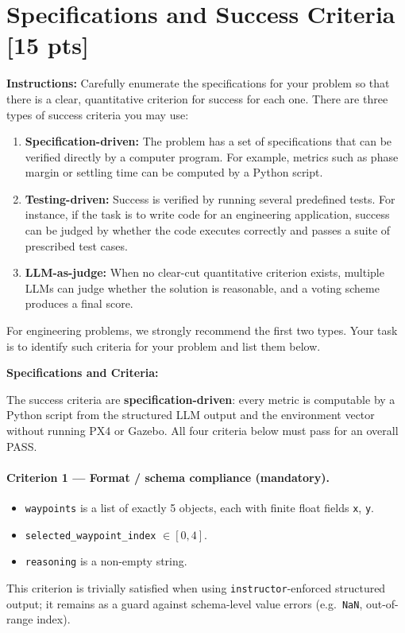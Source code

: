 \documentclass[12pt]{article}
\begin{document}
\newpage
\section{Specifications and Success Criteria [15 pts]}

\noindent\textbf{Instructions:} Carefully enumerate the specifications for your problem so that
there is a clear, quantitative criterion for success for each one. There are three types of
success criteria you may use:
\begin{enumerate}
  \item \textbf{Specification-driven:} The problem has a set of specifications that can be
    verified directly by a computer program. For example, metrics such as phase margin or
    settling time can be computed by a Python script.
  \item \textbf{Testing-driven:} Success is verified by running several predefined tests. For
    instance, if the task is to write code for an engineering application, success can be judged
    by whether the code executes correctly and passes a suite of prescribed test cases.
  \item \textbf{LLM-as-judge:} When no clear-cut quantitative criterion exists, multiple LLMs
    can judge whether the solution is reasonable, and a voting scheme produces a final score.
\end{enumerate}
For engineering problems, we strongly recommend the first two types. Your task is to identify
such criteria for your problem and list them below.

\bigskip
\noindent\textbf{Specifications and Criteria:}

\medskip
The success criteria are \textbf{specification-driven}: every metric is computable by a Python
script from the structured LLM output and the environment vector without running PX4 or Gazebo.
All four criteria below must pass for an overall PASS.

\paragraph{Criterion 1 --- Format / schema compliance (mandatory).}
\begin{itemize}
  \item \texttt{waypoints} is a list of exactly 5 objects, each with finite float fields
    \texttt{x}, \texttt{y}.
  \item \texttt{selected\_waypoint\_index} $\in [0, 4]$.
  \item \texttt{reasoning} is a non-empty string.
\end{itemize}
This criterion is trivially satisfied when using \texttt{instructor}-enforced structured output;
it remains as a guard against schema-level value errors (e.g.\ \texttt{NaN}, out-of-range index).
\end{document}
